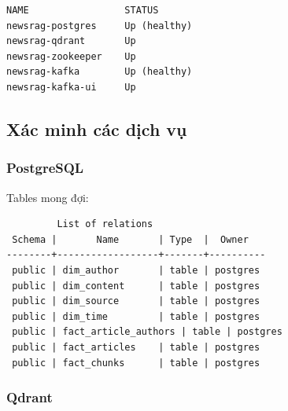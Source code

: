 \begin{verbatim}
NAME                 STATUS
newsrag-postgres     Up (healthy)
newsrag-qdrant       Up
newsrag-zookeeper    Up
newsrag-kafka        Up (healthy)
newsrag-kafka-ui     Up
\end{verbatim}

\hypertarget{xuxe1c-minh-cuxe1c-dux1ecbch-vux1ee5}{%
\subsection{Xác minh các dịch
vụ}}

\hypertarget{postgresql}{%
\subsubsection{PostgreSQL}}

\begin{Shaded}
\begin{Highlighting}[]
 


\end{Highlighting}
\end{Shaded}

Tables mong đợi:

\begin{verbatim}
         List of relations
 Schema |       Name       | Type  |  Owner
--------+------------------+-------+----------
 public | dim_author       | table | postgres
 public | dim_content      | table | postgres
 public | dim_source       | table | postgres
 public | dim_time         | table | postgres
 public | fact_article_authors | table | postgres
 public | fact_articles    | table | postgres
 public | fact_chunks      | table | postgres
\end{verbatim}

\hypertarget{qdrant}{%
\subsubsection{Qdrant}}

\begin{Shaded}
\begin{Highlighting}[]

\end{Highlighting}
\end{Shaded}

